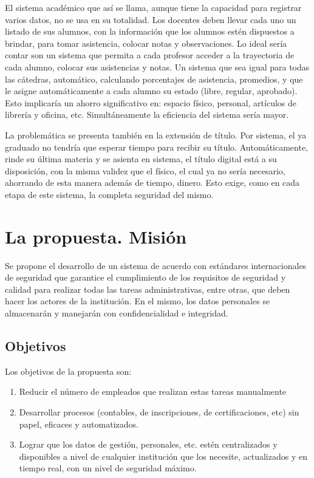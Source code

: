 \documentclass[a4paper]{article}
\begin{document}
El sistema académico que así se llama, aunque tiene la capacidad para registrar varios datos, no se usa en su totalidad. Los docentes deben llevar cada uno un listado de sus alumnos, con la información que los alumnos estén dispuestos a brindar, para tomar asistencia, colocar notas y observaciones. Lo ideal sería contar son un sistema que permita a cada profesor acceder a la trayectoria de cada alumno, colocar sus asistencias y notas. Un sistema que sea igual para todas las cátedras, automático, calculando porcentajes de asistencia, promedios, y que le asigne automáticamente a cada alumno su estado (libre, regular, aprobado).
Esto implicaría un ahorro significativo en: espacio físico, personal, artículos de librería y oficina, etc. Simultáneamente la eficiencia del sistema sería mayor. 

La problemática se presenta también en la extensión de título. Por sistema, el ya graduado no tendría que esperar tiempo para recibir su título. Automáticamente, rinde su última materia y se asienta en sistema, el título digital está a su disposición, con la misma validez que el físico, el cual ya no sería necesario, ahorrando de esta manera además de tiempo, dinero. Esto exige, como en cada etapa de este sistema, la completa seguridad del mismo. 


\section{La propuesta. Misión}

Se propone el desarrollo de un sistema de acuerdo con estándares internacionales de seguridad que garantice el cumplimiento de los requisitos de seguridad y calidad para realizar todas las tareas administrativas, entre otras, que deben hacer los actores de  la institución. En el mismo, los datos personales se almacenarán y manejarán con confidencialidad e integridad.  

\subsection{Objetivos}

Los objetivos de la propuesta son:
\begin{enumerate}
\item Reducir el número de empleados que realizan estas tareas manualmente
\item Desarrollar procesos (contables, de inscripciones, de certificaciones, etc) sin papel, eficaces y automatizados.
\item Lograr que los datos de gestión, personales, etc. estén centralizados y disponibles a nivel de cualquier institución que los necesite, actualizados y en tiempo real, con un nivel de seguridad máximo.
\end{enumerate}
\end{document}
